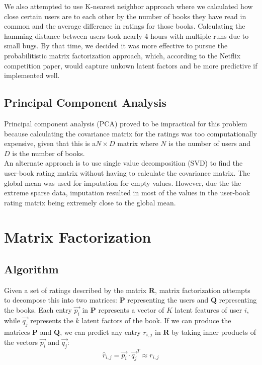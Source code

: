 \documentclass[11pt]{amsart}
\newcommand{\mat}[1]{\mathbf{#1}}
\begin{document}
We also attempted to use K-nearest neighbor approach where we calculated how close certain users are to each other by the number of books they have read in common and the average difference in ratings for those books. Calculating the hamming distance between users took nearly 4 hours with multiple runs due to small bugs. By that time, we decided it was more effective to pursue the probabilitistic matrix factorization approach, which, according to the Netflix competition paper, would capture unkown latent factors and be more predictive if implemented well. 

\subsection{Principal Component Analysis}
Principal component analysis (PCA) proved to be impractical for this problem because calculating the covariance matrix for the ratings was too computationally expensive, given that this is a$N\times D$ matrix where $N$ is the number of users and $D$ is the number of books.\\

An alternate approach is to use single value decomposition (SVD) to find the user-book rating matrix without having to calculate the covariance matrix. The global mean was used for imputation for empty values. However, due the the extreme sparse data, imputation resulted in most of the values in the user-book rating matrix being extremely close to the global mean.


\section{Matrix Factorization}
\subsection{Algorithm}

Given a set of ratings described by the matrix $\mat{R}$, matrix factorization attempts to decompose this into two matrices: $\mat{P}$ representing the users and $\mat{Q}$ representing the books. Each entry $\vec{p_i}$ in $\mat{P}$ represents a vector of $K$ latent features of user $i$, while $\vec{q_j}$ represents the $k$ latent factors of the book. If we can produce the matrices $\mat{P}$ and $\mat{Q}$, we can predict any entry $r_{i,j}$ in $\mat{R}$ by taking inner products of the vectors $\vec{p_i}$ and $\vec{q_j}$:
$$\hat{r}_{i,j} = \vec{p_i} \cdot \vec{q_j}^T \approx r_{i,j}$$
\end{document}
